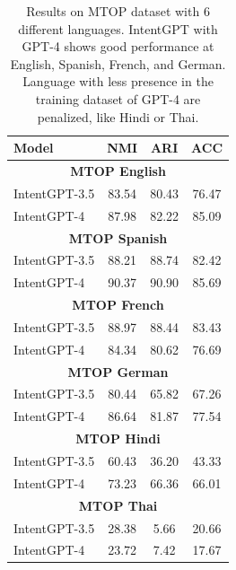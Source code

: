 \documentclass[11pt]{article}
\begin{document}
\begin{table}[t]
    \centering
    \begin{tabular}{@{}lccc@{}} %
        \toprule
        \textbf{Model} & \textbf{NMI} & \textbf{ARI} & \textbf{ACC} \\
        \midrule
        \multicolumn{4}{c}{\textbf{MTOP English}}  \\
        \midrule
        IntentGPT-3.5 & 83.54 & 80.43 & 76.47  \\
        IntentGPT-4 & 87.98 & 82.22 & 85.09\\
        \midrule
        \multicolumn{4}{c}{\textbf{MTOP Spanish}}  \\
        \midrule
        IntentGPT-3.5 & 88.21 & 88.74 & 82.42  \\
        IntentGPT-4 & 90.37 & 90.90 & 85.69\\
        \midrule
        \multicolumn{4}{c}{\textbf{MTOP French}}  \\
        \midrule
        IntentGPT-3.5 & 88.97 & 88.44 & 83.43  \\
        IntentGPT-4 & 84.34 & 80.62 & 76.69\\
        \midrule
        \multicolumn{4}{c}{\textbf{MTOP German}}  \\
        \midrule
        IntentGPT-3.5 & 80.44 & 65.82 & 67.26  \\
        IntentGPT-4 & 86.64 & 81.87 & 77.54\\
        \midrule
        \multicolumn{4}{c}{\textbf{MTOP Hindi}}  \\
        \midrule
        IntentGPT-3.5 & 60.43 & 36.20 & 43.33  \\
        IntentGPT-4 & 73.23 & 66.36 & 66.01\\
        \midrule
        \multicolumn{4}{c}{\textbf{MTOP Thai}}  \\
        \midrule
        IntentGPT-3.5 & 28.38 & 5.66 & 20.66  \\
        IntentGPT-4 & 23.72 & 7.42 & 17.67\\
        \bottomrule
    \end{tabular}
    \caption{Results on MTOP dataset with 6 different languages. IntentGPT with GPT-4 shows good performance at English, Spanish, French, and German. Language with less presence in the training dataset of GPT-4 are penalized, like Hindi or Thai.}
    \label{tab:MTOP}
\end{table}
\end{document}
